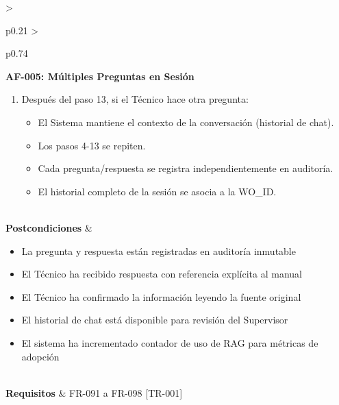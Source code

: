 \begin{longtable}{>{\raggedright\arraybackslash}p{0.21\textwidth} >{\raggedright\arraybackslash}p{0.74\textwidth}}
{\vspace{4pt}\noindent\textbf{AF-005: Múltiples Preguntas en Sesión}
\newline
\begin{enumerate}[leftmargin=1.5em, nosep, topsep=0pt]
\item Después del paso 13, si el Técnico hace otra pregunta:
\begin{itemize}[leftmargin=1.2em, nosep, topsep=0pt]
\item El Sistema mantiene el contexto de la conversación (historial de chat).
\item Los pasos 4-13 se repiten.
\item Cada pregunta/respuesta se registra independientemente en auditoría.
\item El historial completo de la sesión se asocia a la WO\_ID.
\end{itemize}
\end{enumerate} \vspace{2pt}} \\
\textbf{Postcondiciones} & \parbox[t]{\linewidth}{\vspace{2pt} \begin{itemize}[leftmargin=1.5em, nosep, topsep=0pt]
\item La pregunta y respuesta están registradas en auditoría inmutable
\item El Técnico ha recibido respuesta con referencia explícita al manual
\item El Técnico ha confirmado la información leyendo la fuente original
\item El historial de chat está disponible para revisión del Supervisor
\item El sistema ha incrementado contador de uso de RAG para métricas de adopción
\end{itemize} \vspace{2pt}} \\
\textbf{Requisitos} & FR-091 a FR-098 [TR-001] \\ \bottomrule
\end{longtable}\normalsize\vspace{1em}